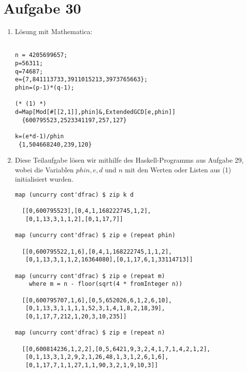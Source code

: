 \section*{Aufgabe 30}
\begin{enumerate}[(1)]
\item Lösung mit Mathematica:
\begin{lstlisting}

n = 4205699657;
p=56311;
q=74687;
e={7,841113733,3911015213,3973765663};
phin=(p-1)*(q-1);

(* (1) *)
d=Map[Mod[#[[2,1]],phin]&,ExtendedGCD[e,phin]]
  {600795523,2523341197,257,127}

k=(e*d-1)/phin
 {1,504668240,239,120}
\end{lstlisting}
\item
Diese Teilaufgabe lösen wir mithilfe des Haskell-Programms aus Aufgabe 29,
wobei die Variablen $phin, e, d$ und $n$ mit den Werten oder Listen aus (1)
initialisiert wurden.
\lstset{language=Haskell}
\begin{lstlisting}
map (uncurry cont'dfrac) $ zip k d

  [[0,600795523],[0,4,1,168222745,1,2],
   [0,1,13,3,1,1,2],[0,1,17,7]]

map (uncurry cont'dfrac) $ zip e (repeat phin)

  [[0,600795522,1,6],[0,4,1,168222745,1,1,2],
   [0,1,13,3,1,1,2,16364080],[0,1,17,6,1,33114713]]

map (uncurry cont'dfrac) $ zip e (repeat m)
	where m = n - floor(sqrt(4 * fromInteger n))

  [[0,600795707,1,6],[0,5,652026,6,1,2,6,10],
   [0,1,13,3,1,1,1,1,52,3,1,4,1,8,2,18,39],
   [0,1,17,7,212,1,20,3,10,235]]

map (uncurry cont'dfrac) $ zip e (repeat n)

  [[0,600814236,1,2,2],[0,5,6421,9,3,2,4,1,7,1,4,2,1,2],
   [0,1,13,3,1,2,9,2,1,26,48,1,3,1,2,6,1,6],
   [0,1,17,7,1,1,27,1,1,90,3,2,1,9,10,3]]

\end{lstlisting}
\end{enumerate}
